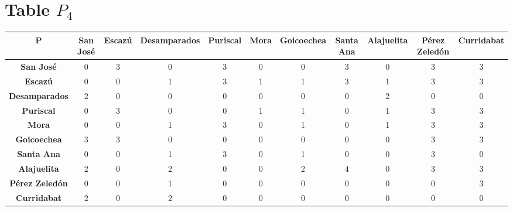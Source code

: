 \documentclass{article}
\begin{document}
\section{Table $P_{4}$}
\begin{center}
    \begin{tabular}{|c||c|c|c|c|c|c|c|c|c|c|}
        \hline
        \textbf{P} & \textbf{San José} & \textbf{Escazú} & \textbf{Desamparados} & \textbf{Puriscal} & \textbf{Mora} & \textbf{Goicoechea} & \textbf{Santa Ana} & \textbf{Alajuelita} & \textbf{Pérez Zeledón} & \textbf{Curridabat} \\
        \hline
        \hline
        \textbf{San José}& 0 & 3 & 0 & 3 & 0 & 0 & 3 & 0 & 3 & 3 \\
        \hline
        \textbf{Escazú}& 0 & 0 & 1 & 3 & 1 & 1 & 3 & 1 & 3 & 3 \\
        \hline
        \textbf{Desamparados}& 2 & 0 & 0 & 0 & 0 & 0 & 0 & 2 & 0 & 0 \\
        \hline
        \textbf{Puriscal}& 0 & 3 & 0 & 0 & 1 & 1 & 0 & 1 & 3 & 3 \\
        \hline
        \textbf{Mora}& 0 & 0 & 1 & 3 & 0 & 1 & 0 & 1 & 3 & 3 \\
        \hline
        \textbf{Goicoechea}& 3 & 3 & 0 & 0 & 0 & 0 & 0 & 0 & 3 & 3 \\
        \hline
        \textbf{Santa Ana}& 0 & 0 & 1 & 3 & 0 & 1 & 0 & 0 & 3 & 0 \\
        \hline
        \textbf{Alajuelita}& 2 & 0 & 2 & 0 & 0 & 2 & \cellcolor[HTML]{D74894}$4$ & 0 & 3 & 3 \\
        \hline
        \textbf{Pérez Zeledón}& 0 & 0 & 1 & 0 & 0 & 0 & 0 & 0 & 0 & 3 \\
        \hline
        \textbf{Curridabat}& 2 & 0 & 2 & 0 & 0 & 0 & 0 & 0 & 0 & 0 \\
        \hline
    \end{tabular}
\end{center}
\end{document}
